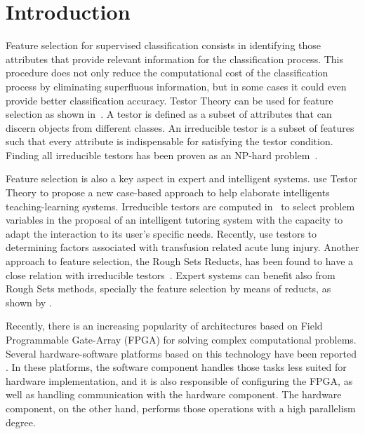 \documentclass[authoryear,preprint,review,12pt]{elsarticle}
\begin{document}

\section{Introduction}
\label{sect:1}

Feature selection for supervised classification consists in identifying those attributes that 
provide relevant information for the classification process. This procedure does not only reduce the 
computational cost of the classification process by eliminating superfluous information, but in some cases 
it could even provide better classification accuracy. 
Testor Theory can be used for feature selection as shown in~\citep{R27,R5}. A testor is defined as a subset of attributes that can discern objects from different classes. An irreducible testor is a subset of features such that every attribute is indispensable for satisfying the testor condition. Finding all irreducible testors has been proven as an NP-hard problem~\citep{R40}.

Feature selection is also a key aspect in expert and intelligent systems. \cite{Mart07} use Testor Theory to propose a new
case-based approach to help elaborate intelligents teaching-learning systems.  Irreducible testors are computed in~\citep{Med07}
to select problem variables in the proposal of an intelligent tutoring system with the capacity to adapt the interaction 
to its user's specific needs. Recently, \cite{Med07} use testors to  determining factors associated with transfusion related 
acute lung injury. Another approach to feature selection, the Rough Sets Reducts, has been found to have a close relation
with irreducible testors~\citep{Lazo15}. Expert systems can benefit also from Rough Sets methods, specially the feature selection
by means of reducts, as shown by \cite{Yah00}.

Recently, there is an increasing popularity of architectures based on Field Programmable Gate-Array (FPGA) 
for solving complex computational problems. Several hardware-software platforms based on this technology have 
been reported \citep{R29,R30}. 
In these platforms, the software component handles those tasks less suited for hardware implementation, 
and it is also responsible of configuring the FPGA, as well as handling communication with the hardware component. 
The hardware component, on the other hand, performs those operations with a high parallelism degree.
\end{document}
